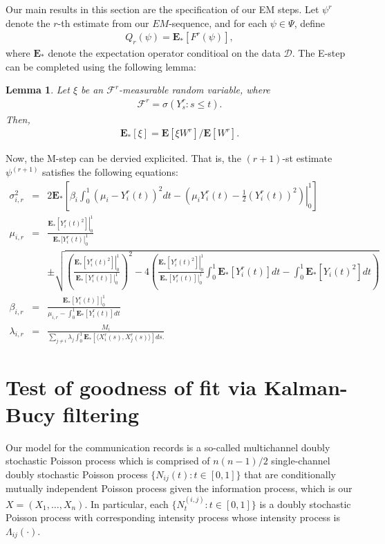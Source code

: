 \documentclass[12pt]{article}%
\newtheorem{lem}{Lemma}
\begin{document}
Our main results in this section are the specification of our EM steps.  Let $\psi^r$ denote the $r$-th estimate from our $EM$-sequence, and for each $\psi \in \Psi$, define  
\begin{eqnarray}
Q_r(\psi) = \mathbf E_*[F^r(\psi)],
\end{eqnarray}
where $\mathbf E_*$ denote the expectation operator conditioal on the data $\mathcal D$.  
The E-step can be completed using the following lemma:
\begin{lem}
Let $\xi$ be an $\mathcal F^r$-measurable random variable, where
\begin{eqnarray}
\mathcal F^r = \sigma(Y_s^r: s \le t).
\end{eqnarray}  
Then, 
\begin{eqnarray}
\mathbf E_*[\xi] = \mathbf E[\xi W^r]/\mathbf E[W^r].
\end{eqnarray}
\end{lem}
Now, the M-step can be dervied explicited.  That is, the $(r+1)$-st estimate $\psi^{(r+1)}$ satisfies the following equations:
\begin{eqnarray*}
\sigma_{i,r}^2 &=& 2 \mathbf E_*\left[ \beta_i \int_0^1 \left(\mu_i - Y_i^r(t)\right)^2dt 
- \left(\left.\mu_i Y_i^r(t) - \frac{1}{2} (Y_i^r(t))^2\right)\right|_0^1\right]\\\mu_{i,r} 
&=&  \frac{\left. \mathbf E_*[Y_i^r(t)^2]\right|_0^1}{\left.\mathbf E_*[Y_i^r(t)\right|_0^1}\\ 
&\ &\pm
\sqrt{
\left(\frac{\left.\mathbf E_*[Y_i^r(t)^2]\right|_0^1}{\left.\mathbf E_*[Y_i^r(t)]\right|_0^1}\right)^2 
-
4\left( \frac{\left.\mathbf E_*[Y_i^r(t)^2]\right|_0^1}{\left.\mathbf E_*[Y_i^r(t)]\right|_0^1} \int_0^1\mathbf E_*[Y_i^r(t)]dt - \int_0^1 \mathbf E_*[Y_i(t)^2] dt\right)}\\
\beta_{i,r}
&=&
\frac{\left. \mathbf E_*[Y_i^r(t)] \right|_0^1}{\mu_{i,r} - \int_0^1 \mathbf E_*[Y_i^r(t)]dt}\\
\lambda_{i,r} 
&=& 
\frac{M_i}
{
\sum_{j\neq i} \lambda_j \int_0^1 \mathbf E_*[\langle X_i^r(s), X_j^r(s)\rangle] ds.
} 
\end{eqnarray*}


\section{Test of goodness of fit via Kalman-Bucy filtering}
Our model for the communication records is a so-called multichannel doubly stochastic Poisson process 
which is comprised of $n(n-1)/2$ single-channel doubly stochastic Poisson process $\{N_{ij}(t):t\in[0,1]\}$ 
that are conditionally mutually independent Poisson process given the information process, 
which is our $X=(X_1,\ldots,X_n)$.  In particular, each $\{N_t^{(i,j)} : t \in [0,1]\}$ is a doubly stochastic 
Poisson process with corresponding intensity process whose intensity process is $\Lambda_{ij}(\cdot)$.  
\end{document}
